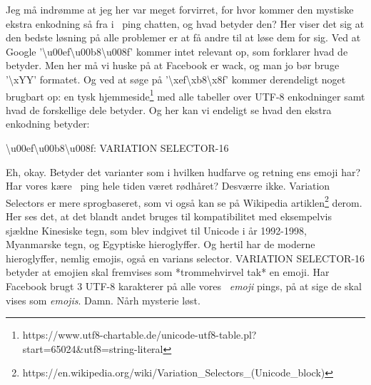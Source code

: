 \begin{article}
Jeg må indrømme at jeg her var meget forvirret, for hvor kommer den mystiske ekstra enkodning så fra i \coffee\ ping chatten, og hvad betyder den?
Her viser det sig at den bedste løsning på alle problemer er at få andre til at løse dem for sig. Ved at Google '\textbackslash u00ef\textbackslash u00b8\textbackslash u008f' kommer intet relevant op, som forklarer hvad de betyder. Men her må vi huske på at Facebook er wack, og man jo bør bruge '\textbackslash xYY' formatet. Og ved at søge på '\textbackslash xef\textbackslash xb8\textbackslash x8f' kommer derendeligt noget brugbart op: en tysk hjemmeside\footnote{https://www.utf8-chartable.de/unicode-utf8-table.pl?start=65024\&utf8=string-literal} med alle tabeller over UTF-8 enkodninger samt hvad de forskellige dele betyder. Og her kan vi endeligt se hvad den ekstra enkodning betyder:
\begin{center}
	\textbackslash u00ef\textbackslash u00b8\textbackslash u008f: VARIATION SELECTOR-16
\end{center}
Eh, okay. Betyder det varianter som i hvilken hudfarve og retning ens emoji har? Har vores kære \coffee\ ping hele tiden været rødhåret? Desværre ikke. Variation Selectors er mere sprogbaseret, som vi også kan se på Wikipedia artiklen\footnote{https://en.wikipedia.org/wiki/Variation\_Selectors\_(Unicode\_block)} derom. Her ses det, at det blandt andet bruges til kompatibilitet med eksempelvis sjældne Kinesiske tegn, som blev indgivet til Unicode i år 1992-1998, Myanmarske tegn, og Egyptiske hieroglyffer. Og hertil har de moderne hieroglyffer, nemlig emojis, også en varians selector. VARIATION SELECTOR-16 betyder at emojien skal fremvises som *trommehvirvel tak* en emoji.
Har Facebook brugt 3 UTF-8 karakterer på alle vores \coffee\ \emph{emoji} pings, på at sige de skal vises som \emph{emojis}. Damn.
Nårh mysterie løst.


\end{article}
